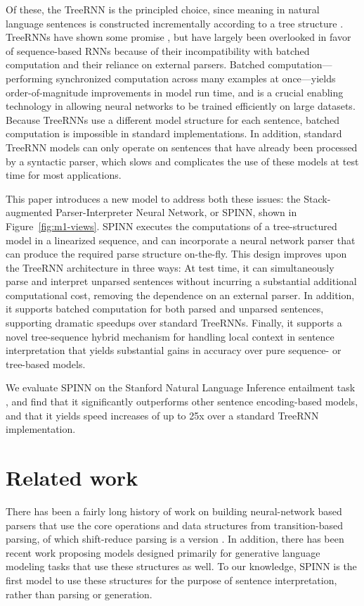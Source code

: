 \documentclass[11pt]{article}
\begin{document}
Of these, the TreeRNN is the principled choice, since meaning in natural language sentences is constructed incrementally according to a tree structure \citep[][i.a.]{Szabolcsi:2009}. TreeRNNs have shown some promise \citep{tai2015improved,li2015tree,bowman2015trees}, but have largely been overlooked in favor of sequence-based RNNs because of their incompatibility with batched computation and their reliance on external parsers.  Batched computation---performing synchronized computation across many examples at once---yields order-of-magnitude improvements in model run time, and is a crucial enabling technology in allowing neural networks to be trained efficiently on large datasets. Because TreeRNNs use a different model structure for each sentence, batched computation is impossible in standard implementations. In addition, standard TreeRNN models can only operate on sentences that have already been processed by a syntactic parser, which slows and complicates the use of these models at test time for most applications.

This paper introduces a new model to address both these issues: the Stack-augmented Parser-Interpreter Neural Network, or SPINN, shown in Figure~\ref{fig:m1-views}. SPINN executes the computations of a tree-structured model in a linearized sequence, and can incorporate a neural network parser that can produce the required parse structure on-the-fly. This design improves upon the TreeRNN architecture in three ways: At test time, it can simultaneously parse and interpret unparsed sentences without incurring a substantial additional computational cost, removing the dependence on an external parser. In addition, it supports batched computation for both parsed and unparsed sentences, supporting dramatic speedups over standard TreeRNNs. Finally, it supports a novel tree-sequence hybrid mechanism for handling local context in sentence interpretation that yields substantial gains in accuracy over pure sequence- or tree-based models.

We evaluate SPINN on the Stanford Natural Language Inference entailment task \citep[SNLI,][]{snli:emnlp2015}, and find that it significantly outperforms other sentence encoding-based models, and that it yields speed increases of up to 25x over a standard TreeRNN implementation.

\section{Related work}

There has been a fairly long history of work on building neural-network based parsers that use the core operations and data structures from transition-based parsing, of which shift-reduce parsing is a version \citep{henderson2004discriminative,emami2005neural,titov2010latent,chen2014,buys2generative,dyer-EtAl:2015:ACL-IJCNLP,kiperwasser2016easy}. In addition, there has been recent work \citep{zhang2016top,dyer2016rnn} proposing models designed primarily for generative language modeling tasks that use these structures as well. To our knowledge, SPINN is the first model to use these structures for the purpose of sentence interpretation, rather than parsing or generation.
\end{document}
